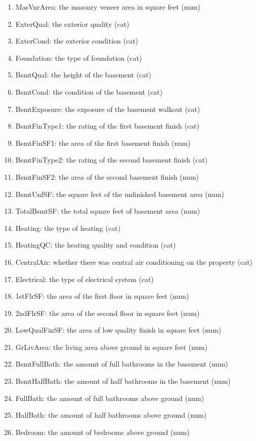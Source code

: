 \documentclass[12pt]{article}
\begin{document}
\begin{enumerate}
\item MasVnrArea: the masonry veneer area in square feet (num)
\item ExterQual: the exterior quality (cat)
\item ExterCond: the exterior condition (cat)
\item Foundation: the type of foundation (cat)
\item BsmtQual: the height of the basement (cat)
\item BsmtCond: the condition of the basement (cat)
\item BsmtExposure: the exposure of the basement walkout (cat)
\item BsmtFinType1: the rating of the first basement finish (cat)
\item BsmtFinSF1: the area of the first basement finish (num)
\item BsmtFinType2: the rating of the second basement finish (cat)
\item BsmtFinSF2: the area of the second basement finish (num)
\item BsmtUnfSF: the square feet of the unfinished basement area (num)
\item TotalBsmtSF: the total square feet of basement area (num)
\item Heating: the type of heating (cat)
\item HeatingQC: the heating quality and condition (cat)
\item CentralAir: whether there was central air conditioning on the property (cat)
\item Electrical: the type of electrical system (cat)
\item 1stFlrSF: the area of the first floor in square feet (num)
\item 2ndFlrSF: the area of the second floor in square feet (num)
\item LowQualFinSF: the area of low quality finish in square feet (num)
\item GrLivArea: the living area above ground in square feet (num)
\item BsmtFullBath: the amount of full bathrooms in the basement (num)
\item BsmtHalfBath: the amount of half bathrooms in the basement (num)
\item FullBath: the amount of full bathrooms above ground (num)
\item HalfBath: the amount of half bathrooms above ground (num)
\item Bedroom: the amount of bedrooms above ground (num)

\end{enumerate}
\end{document}
